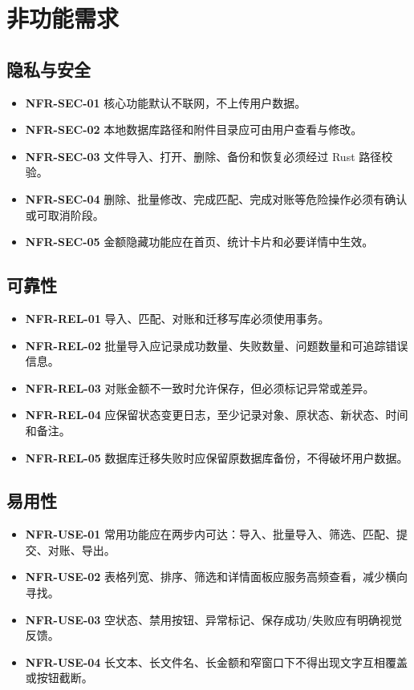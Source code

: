 \documentclass[UTF8,zihao=-4]{ctexart}
\newcommand{\req}[1]{\textbf{\textcolor{ivicBrown}{#1}}}
\begin{document}
\section{非功能需求}

\subsection{隐私与安全}

\begin{itemize}
  \item \req{NFR-SEC-01} 核心功能默认不联网，不上传用户数据。
  \item \req{NFR-SEC-02} 本地数据库路径和附件目录应可由用户查看与修改。
  \item \req{NFR-SEC-03} 文件导入、打开、删除、备份和恢复必须经过 Rust 路径校验。
  \item \req{NFR-SEC-04} 删除、批量修改、完成匹配、完成对账等危险操作必须有确认或可取消阶段。
  \item \req{NFR-SEC-05} 金额隐藏功能应在首页、统计卡片和必要详情中生效。
\end{itemize}

\subsection{可靠性}

\begin{itemize}
  \item \req{NFR-REL-01} 导入、匹配、对账和迁移写库必须使用事务。
  \item \req{NFR-REL-02} 批量导入应记录成功数量、失败数量、问题数量和可追踪错误信息。
  \item \req{NFR-REL-03} 对账金额不一致时允许保存，但必须标记异常或差异。
  \item \req{NFR-REL-04} 应保留状态变更日志，至少记录对象、原状态、新状态、时间和备注。
  \item \req{NFR-REL-05} 数据库迁移失败时应保留原数据库备份，不得破坏用户数据。
\end{itemize}

\subsection{易用性}

\begin{itemize}
  \item \req{NFR-USE-01} 常用功能应在两步内可达：导入、批量导入、筛选、匹配、提交、对账、导出。
  \item \req{NFR-USE-02} 表格列宽、排序、筛选和详情面板应服务高频查看，减少横向寻找。
  \item \req{NFR-USE-03} 空状态、禁用按钮、异常标记、保存成功/失败应有明确视觉反馈。
  \item \req{NFR-USE-04} 长文本、长文件名、长金额和窄窗口下不得出现文字互相覆盖或按钮截断。
\end{itemize}
\end{document}
